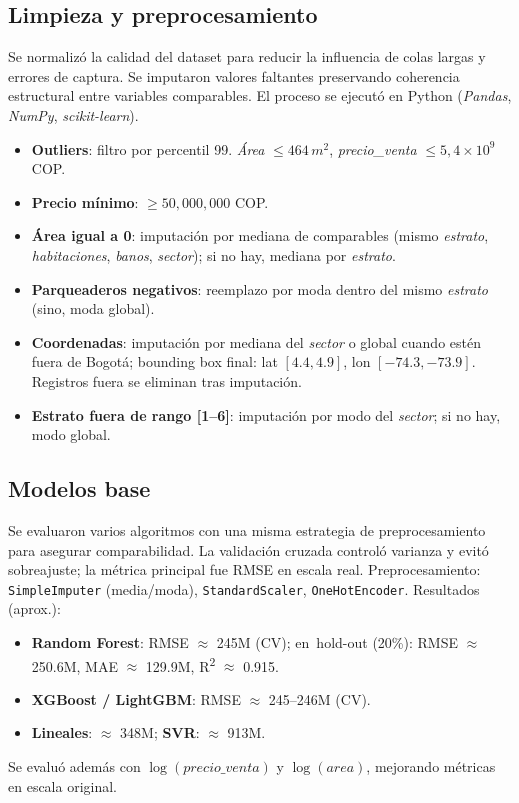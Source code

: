 \subsection*{Limpieza y preprocesamiento}
Se normalizó la calidad del dataset para reducir la influencia de colas largas y errores de captura. Se imputaron valores faltantes preservando coherencia estructural entre variables comparables. El proceso se ejecutó en Python (\textit{Pandas}, \textit{NumPy}, \textit{scikit-learn}).
\begin{itemize}
    \item \textbf{Outliers}: filtro por percentil 99. \emph{Área} \(\leq 464\,m^2\), \emph{precio\_venta} \(\leq 5{,}4\times 10^9\) COP.
    \item \textbf{Precio mínimo}: \(\geq 50{,}000{,}000\) COP.
    \item \textbf{Área igual a 0}: imputación por mediana de comparables (mismo \emph{estrato}, \emph{habitaciones}, \emph{banos}, \emph{sector}); si no hay, mediana por \emph{estrato}.
    \item \textbf{Parqueaderos negativos}: reemplazo por moda dentro del mismo \emph{estrato} (sino, moda global).
    \item \textbf{Coordenadas}: imputación por mediana del \emph{sector} o global cuando estén fuera de Bogotá; bounding box final: lat \([4.4, 4.9]\), lon \([-74.3, -73.9]\). Registros fuera se eliminan tras imputación.
    \item \textbf{Estrato fuera de rango [1--6]}: imputación por modo del \emph{sector}; si no hay, modo global.
\end{itemize}

\subsection*{Modelos base}
Se evaluaron varios algoritmos con una misma estrategia de preprocesamiento para asegurar comparabilidad. La validación cruzada controló varianza y evitó sobreajuste; la métrica principal fue RMSE en escala real.
Preprocesamiento: \texttt{SimpleImputer} (media/moda), \texttt{StandardScaler}, \texttt{OneHotEncoder}. Resultados (aprox.):
\begin{itemize}
    \item \textbf{Random Forest}: RMSE \(\approx\) 245M (CV); en\ hold-out (20\%): RMSE \(\approx\) 250.6M, MAE \(\approx\) 129.9M, R\textsuperscript{2} \(\approx\) 0.915.
    \item \textbf{XGBoost / LightGBM}: RMSE \(\approx\) 245--246M (CV).
    \item \textbf{Lineales}: \(\approx\) 348M; \textbf{SVR}: \(\approx\) 913M.
\end{itemize}
Se evaluó además con \(\log(\textit{precio\_venta})\) y \(\log(\textit{area})\), mejorando métricas en escala original.

